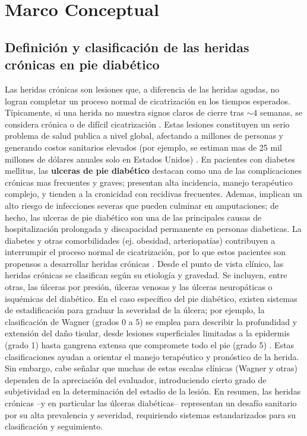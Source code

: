                 

\section{Marco Conceptual}
\label{sc:MC}


\subsection{Definición y clasificación de las heridas crónicas en pie diabético}
Las heridas crónicas son lesiones que, a diferencia de las heridas agudas, no logran completar un proceso normal de cicatrización en los tiempos esperados. Típicamente, si una herida no muestra signos claros de cierre tras $\sim 4$ semanas, se considera crónica o de difícil cicatrización \cite{healthcare11020273}. Estas lesiones constituyen un serio problema de salud publica a nivel global, afectando a millones de personas y generando costos sanitarios elevados (por ejemplo, se estiman mas de 25 mil millones de dólares anuales solo en Estados Unidos) \cite{healthcare11020273}. En pacientes con diabetes mellitus, las \textbf{ulceras de pie diabético} destacan como una de las complicaciones crónicas mas frecuentes y graves; presentan alta incidencia, manejo terapéutico complejo, y tienden a la cronicidad con recidivas frecuentes. Ademas, implican un alto riesgo de infecciones severas que pueden culminar en amputaciones; de hecho, las ulceras de pie diabético son una de las principales causas de hospitalización prolongada y discapacidad permanente en personas diabeticas. La diabetes y otras comorbilidades (ej. obesidad, arteriopatías) contribuyen a interrumpir el proceso normal de cicatrización, por lo que estos pacientes son propensos a desarrollar heridas crónicas \cite{healthcare11020273}.
Desde el punto de vista clínico, las heridas crónicas se clasifican según su etiología y gravedad. Se incluyen, entre otras, las úlceras por presión, úlceras venosas y las úlceras neuropáticas o isquémicas del diabético. En el caso específico del pie diabético, existen sistemas de estadificación para graduar la severidad de la úlcera; por ejemplo, la clasificación de Wagner (grados 0 a 5) se emplea para describir la profundidad y extensión del daño tisular, desde lesiones superficiales limitadas a la epidermis (grado 1) hasta gangrena extensa que compromete todo el pie (grado 5) \cite{healthcare11020273}. Estas clasificaciones ayudan a orientar el manejo terapéutico y pronóstico de la herida. Sin embargo, cabe señalar que muchas de estas escalas clínicas (Wagner y otras) dependen de la apreciación del evaluador, introduciendo cierto grado de subjetividad en la determinación del estadio de la lesión. En resumen, las heridas crónicas –y en particular las úlceras diabéticas– representan un desafío sanitario por su alta prevalencia y severidad, requiriendo sistemas estandarizados para su clasificación y seguimiento.

